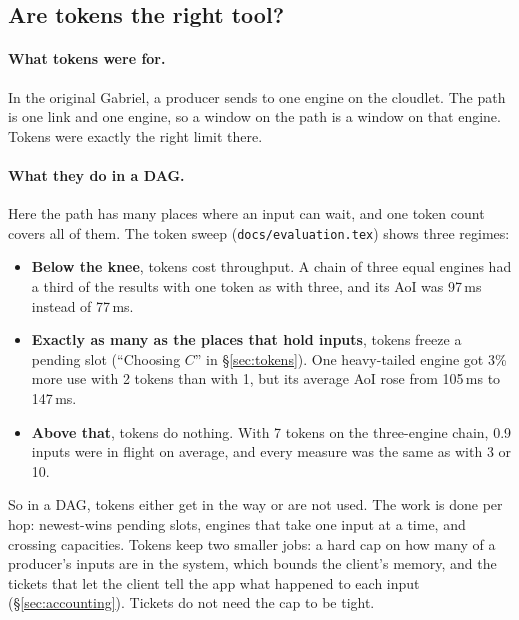 \documentclass[11pt]{article}
\newcommand{\code}[1]{\texttt{#1}}
\begin{document}
\subsection{Are tokens the right tool?}
\label{sec:alternatives}

\paragraph{What tokens were for.} In the original Gabriel, a producer sends
to one engine on the cloudlet. The path is one link and one engine, so a
window on the path is a window on that engine. Tokens were exactly the right
limit there.

\paragraph{What they do in a DAG.} Here the path has many places where an
input can wait, and one token count covers all of them. The token sweep
(\code{docs/evaluation.tex}) shows three regimes:
\begin{itemize}[nosep]
  \item \textbf{Below the knee}, tokens cost throughput. A chain of three
        equal engines had a third of the results with one token as with
        three, and its AoI was 97\,ms instead of 77\,ms.
  \item \textbf{Exactly as many as the places that hold inputs}, tokens
        freeze a pending slot (``Choosing $C$'' in \S\ref{sec:tokens}). One
        heavy-tailed engine got 3\% more use with 2 tokens than with 1, but
        its average AoI rose from 105\,ms to 147\,ms.
  \item \textbf{Above that}, tokens do nothing. With 7 tokens on the
        three-engine chain, 0.9 inputs were in flight on average, and every
        measure was the same as with 3 or 10.
\end{itemize}
So in a DAG, tokens either get in the way or are not used. The work is done
per hop: newest-wins pending slots, engines that take one input at a time,
and crossing capacities. Tokens keep two smaller jobs: a hard cap on how many
of a producer's inputs are in the system, which bounds the client's memory,
and the tickets that let the client tell the app what happened to each input
(\S\ref{sec:accounting}). Tickets do not need the cap to be tight.
\end{document}

